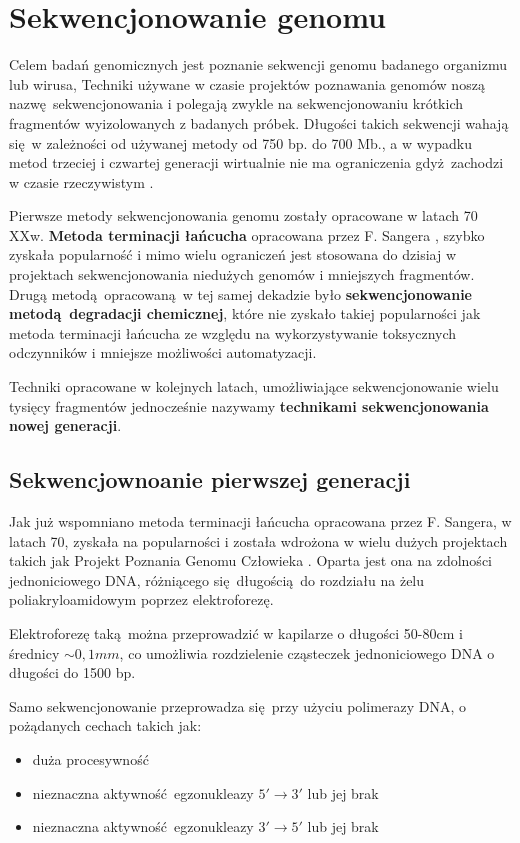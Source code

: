 \documentclass[two column, twoside, a4paper]{article}
\begin{document}
\section{Sekwencjonowanie genomu}

Celem badań genomicznych jest poznanie sekwencji genomu badanego organizmu lub wirusa, Techniki używane w czasie projektów poznawania genomów noszą nazwę sekwencjonowania i polegają zwykle na sekwencjonowaniu krótkich fragmentów wyizolowanych z badanych próbek. Długości takich sekwencji wahają się w zależności od używanej metody od 750 bp. do 700 Mb., a w wypadku metod trzeciej i czwartej generacji wirtualnie nie ma ograniczenia gdyż zachodzi w czasie rzeczywistym \autocite{Brown2019}.

Pierwsze metody sekwencjonowania genomu zostały opracowane w latach 70 XXw. \textbf{Metoda terminacji łańcucha} opracowana przez F. Sangera \autocite{Sanger1977}, szybko zyskała popularność i mimo wielu ograniczeń jest stosowana do dzisiaj w projektach sekwencjonowania niedużych genomów \autocite{Brown2000} i mniejszych fragmentów. Drugą metodą opracowaną w tej samej dekadzie było \textbf{sekwencjonowanie metodą degradacji chemicznej}, które nie zyskało takiej popularności jak metoda terminacji łańcucha ze względu na wykorzystywanie toksycznych odczynników i mniejsze możliwości automatyzacji.

Techniki opracowane w kolejnych latach, umożliwiające sekwencjonowanie wielu tysięcy fragmentów jednocześnie nazywamy \textbf{technikami sekwencjonowania nowej generacji}.

\subsection{Sekwencjownoanie pierwszej generacji}

Jak już wspomniano metoda terminacji łańcucha opracowana przez F. Sangera, w latach 70, zyskała na popularności i została wdrożona w wielu dużych projektach takich jak Projekt Poznania Genomu Człowieka \autocite{IHGSC2001}. Oparta jest ona na zdolności jednoniciowego DNA, różniącego się długością do rozdziału na żelu poliakryloamidowym poprzez elektroforezę.

Elektroforezę taką można przeprowadzić w kapilarze o długości 50-80cm i średnicy $\sim 0,1mm$, co umożliwia rozdzielenie cząsteczek jednoniciowego DNA o długości do 1500 bp.

Samo sekwencjonowanie przeprowadza się przy użyciu polimerazy DNA, o pożądanych cechach takich jak:
\begin{itemize}
\item duża procesywność
\item nieznaczna aktywność egzonukleazy $5'\rightarrow3'$ lub jej brak
\item nieznaczna aktywność egzonukleazy $3'\rightarrow5'$ lub jej brak
\end{itemize}
\end{document}
